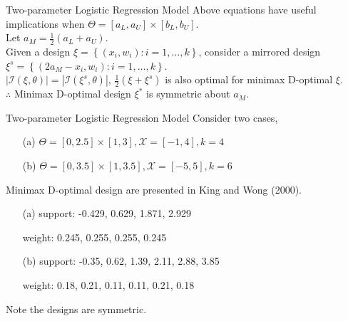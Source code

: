 \documentclass{beamer}
\begin{document}
\begin{frame}{Two-parameter Logistic Regression Model}
  Above equations have useful implications when $\Theta = \left[a_L,a_U\right]\times\left[b_L,b_U\right]$.\\
  \vspace{6mm}
  Let $a_M = \frac{1}{2}(a_L+a_U)$.\\
  \vspace{3mm}
  Given a design $\xi = \left\{ (x_i,w_i) : i=1,\ldots,k \right\}$, consider a mirrored design $\xi^s = \left\{ (2a_M-x_i,w_i) : i=1,\ldots,k \right\}$.\\
  \vspace{3mm}
  $\left| \mathcal{I} \left( \xi,\theta \right) \right| = \left| \mathcal{I} \left( \xi^s,\theta \right) \right|$, $\frac{1}{2}(\xi+\xi^s)$ is also optimal for minimax D-optimal $\xi$.\\
  \vspace{6mm}
  $\therefore$ \hspace{1mm} Minimax D-optimal design $\xi^*$ is symmetric about $a_M$.\\
\end{frame}

\begin{frame}{Two-parameter Logistic Regression Model}
  Consider two cases,\\
  \vspace{3mm}
  \begin{itemize}
    \item[(a)] $\Theta=\left[0,2.5\right]\times\left[1,3\right],\mathcal{X}=\left[-1,4\right], k=4$
    \item[(b)] $\Theta=\left[0,3.5\right]\times\left[1,3.5\right],\mathcal{X}=\left[-5,5\right], k=6$
  \end{itemize}
  \vspace{3mm}
  Minimax D-optimal design are presented in King and Wong (2000).
  \vspace{3mm}
  \begin{itemize}
    \item[(a)] support: -0.429, 0.629, 1.871, 2.929
    \item[] weight: 0.245, 0.255, 0.255, 0.245
    \item[(b)] support: -0.35, 0.62, 1.39, 2.11, 2.88, 3.85
    \item[] weight: 0.18, 0.21, 0.11, 0.11, 0.21, 0.18
  \end{itemize}
  \vspace{3mm}
  Note the designs are symmetric.
\end{frame}
\end{document}
